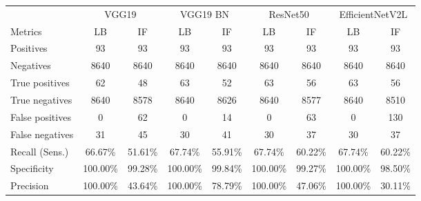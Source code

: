 \begin{table}[H]
    \centering
    \begin{tabular}{l | c c | c c | c c | c c}
                        & \multicolumn{2}{c|}{VGG19} & \multicolumn{2}{c|}{VGG19 BN} & \multicolumn{2}{c|}{ResNet50} & \multicolumn{2}{c}{EfficientNetV2L}                                           \\
        Metrics         & LB                         & IF                            & LB                            & IF                                  & LB       & IF      & LB       & IF      \\
        \hline
        Positives       & 93                         & 93                            & 93                            & 93                                  & 93       & 93      & 93       & 93      \\
        Negatives       & 8640                       & 8640                          & 8640                          & 8640                                & 8640     & 8640    & 8640     & 8640    \\
        True positives  & 62                         & 48                            & 63                            & 52                                  & 63       & 56      & 63       & 56      \\
        True negatives  & 8640                       & 8578                          & 8640                          & 8626                                & 8640     & 8577    & 8640     & 8510    \\
        False positives & 0                          & 62                            & 0                             & 14                                  & 0        & 63      & 0        & 130     \\
        False negatives & 31                         & 45                            & 30                            & 41                                  & 30       & 37      & 30       & 37      \\
        \hline
        Recall (Sens.)  & 66.67\%                    & 51.61\%                       & 67.74\%                       & 55.91\%                             & 67.74\%  & 60.22\% & 67.74\%  & 60.22\% \\
        Specificity     & 100.00\%                   & 99.28\%                       & 100.00\%                      & 99.84\%                             & 100.00\% & 99.27\% & 100.00\% & 98.50\% \\
        Precision       & 100.00\%                   & 43.64\%                       & 100.00\%                      & 78.79\%                             & 100.00\% & 47.06\% & 100.00\% & 30.11\% \\

\end{tabular}
\end{table}

